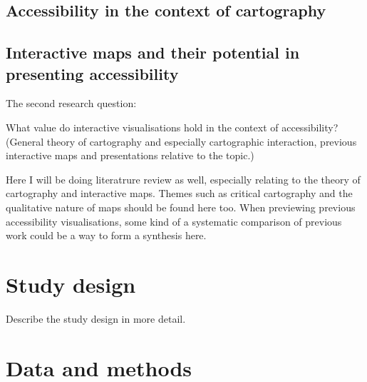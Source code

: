 \documentclass[12pt]{article}
\begin{document}
\textcite{rot2013a, rot2013b}


\subsection{Accessibility in the context of cartography}




\subsection{Interactive maps and their potential in presenting accessibility}
The second research question:

\begin{displayquote}
What value do interactive visualisations hold in the context of accessibility?
(General theory of cartography and especially cartographic interaction,
previous interactive maps and presentations relative to the topic.)
\end{displayquote}

Here I will be doing literatrure review as well,
especially relating to the theory of cartography and interactive maps.
Themes such as critical cartography
and the qualitative nature of maps should be found here too.
When previewing previous accessibility visualisations,
some kind of a systematic comparison of previous work
could be a way to form a synthesis here.

\section{Study design}
Describe the study design in more detail.

\section{Data and methods}
\end{document}
